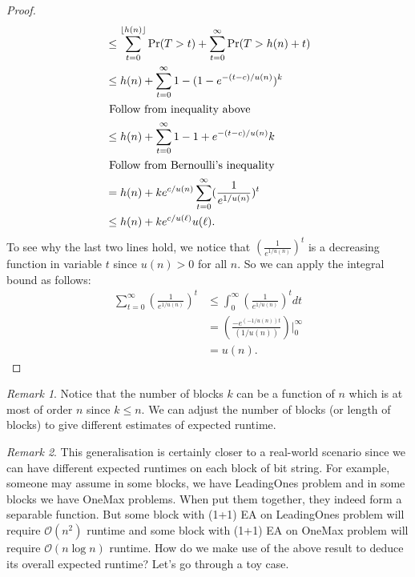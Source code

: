 \documentclass[a4paper,11pt]{report}
\DeclarePairedDelimiter\floor{\lfloor}{\rfloor}
\theoremstyle{plain} %
\theoremstyle{definition} %
\theoremstyle{remark} %
\newtheorem*{rem}{Remark}
\begin{document}
\begin{proof}
\begin{align*}
                                                     & \leq \sum_{t=0}^{\floor{h(n)} } \Pr(T>t) + \sum_{t=0}^{\infty} \Pr(T>h(n) +t)\\
                                                     &\leq h(n) + \sum_{t=0}^{\infty}1-(1-e^{-(t-c)/u(n)})^k \\  \intertext{ Follow from inequality above}
                                                     &\leq h(n) + \sum_{t=0}^{\infty} 1 -1 + e^{-(t-c)/u(n)} k  \\ \intertext{ Follow from Bernoulli's inequality}
                                                     &=h(n) + k e^{c/u(n)} \sum_{t=0}^{\infty} (\frac{1}{e^{1/u(n)}})^t \\
                                                     & \leq h(n)+ke^{c/u(\ell)}u(\ell).
\end{align*}
 To see why the last two lines hold, we notice that  $(\frac{1}{e^{1/u(n)}})^t$ is a decreasing function in variable $t$ since $u(n)>0$ for all $n$. So we can apply the integral bound as follows:
 \begin{align*}
     \sum_{t=0}^{\infty} (\frac{1}{e^{1/u(n)}})^t & \leq \int_{0}^{\infty} (\frac{1}{e^{1/u(n)}})^t dt \\
                                                & = (\frac{-e^{(-1/u(n))t}}{(1/u(n))} )|_{0}^{\infty} \\
                                                & = u(n).
 \end{align*}

\end{proof}
\begin{rem}
Notice that the number of blocks $k$ can be a function of $n$ which is at most of order $n$ since $k \leq n$. We can adjust the number of blocks (or length of blocks) to give different estimates of expected runtime.
\end{rem}

\begin{rem} This generalisation is certainly closer to a real-world scenario since we can have different expected runtimes on each block of bit string. For example, someone may assume in some blocks, we have {\sc LeadingOnes} problem and in some blocks we have {\sc OneMax} problems. When put them together, they indeed form a separable function. But some block with (1+1) EA on {\sc LeadingOnes} problem  will require $\mathcal{O}(n^2)$ runtime and some block with (1+1) EA on {\sc OneMax} problem  will require $\mathcal{O}(n\log n)$ runtime. How do we make use of the above result to deduce its overall expected runtime? Let's go through a toy case.

\end{rem}
\end{document}
